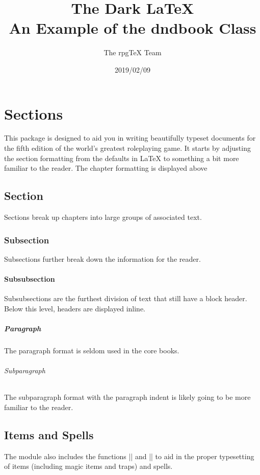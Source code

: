 \documentclass[letterpaper,twocolumn,openany]{dndbook}
\title{The Dark \LaTeX{} \\
\large An Example of the dndbook Class}
\author{The rpgTeX Team}
\date{2019/02/09}
\begin{document}
\frontmatter

\maketitle

\tableofcontents

\mainmatter%

\chapter{Sections}

This package is designed to aid you in writing beautifully typeset documents for the fifth edition of the world's greatest roleplaying game. It starts by adjusting the section formatting from the defaults in \LaTeX{} to something a bit more familiar to the reader. The chapter formatting is displayed above

\section{Section}
Sections break up chapters into large groups of associated text.

\subsection{Subsection}
Subsections further break down the information for the reader.

\subsubsection{Subsubsection}
Subsubsections are the furthest division of text that still have a block header. Below this level, headers are displayed inline.

\paragraph{Paragraph}
The paragraph format is seldom used in the core books.

\subparagraph{Subparagraph}
The subparagraph format with the paragraph indent is likely going to be more familiar to the reader.

\section{Items and Spells}
The module also includes the functions |\subtitlesection| and |\spellheader| to aid in the proper typesetting of items (including magic items and traps) and spells.
\end{document}
